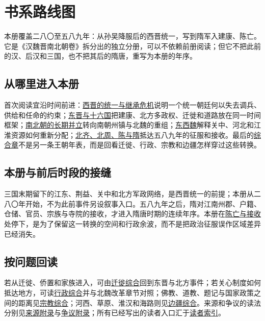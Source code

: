 \chapter{书系路线图}
\label{app:series-roadmap}

本册覆盖二八〇至五八九年：从孙吴降服后的西晋统一，写到隋军入建康、陈亡。它是《汉魏晋南北朝卷》拆分出的独立分册，可以不依赖前册阅读；但它不把此前的汉、后汉和三国，也不把其后的隋唐，重写为本册的年序。

\section{从哪里进入本册}

首次阅读宜沿时间前进：\hyperref[ch:western-jin]{西晋的统一与继承危机}说明一个统一朝廷何以失去调兵、供给和任命的约束；\hyperref[ch:eastern-jin-sixteen-kingdoms]{东晋与十六国}把建康、北方多政权、迁徙和道路放在同一时间框架；\hyperref[ch:northern-southern-dynasties]{南北朝的长期并立}转向南朝州镇与北魏的重组；\hyperref[ch:eastern-western-wei]{东西魏}解释关中、河北和江淮资源如何重新分配；\hyperref[ch:northern-qi-zhou-chen-sui]{北齐、北周、陈与隋}抵达五八九年的征服和接收。最后的\hyperref[ch:synthesis]{综合章}不是另一条王朝年表，而是回看迁徙、行政、宗教和边疆怎样穿过这些转换。

\section{本册与前后时段的接缝}

三国末期留下的江东、荆益、关中和北方军政网络，是西晋统一的前提；本册从二八〇年开始，不为此前事件另设叙事入口。五八九年之后，隋对江南州郡、户籍、仓储、官员、宗族与寺院的接收，才进入隋唐时期的连续年序。本册在\hyperref[sec:chen-sui-reunification]{陈亡与接收}处停下，是为了保留这一转换的空间和行政余波，而不是把政治征服误作区域差异已经消失。

\section{按问题回读}

若从迁徙、侨置和家族进入，可由\hyperref[sec:synthesis-migration]{迁徙综合}回到东晋与北方事件；若关心制度如何抵达地方，可读\hyperref[sec:synthesis-administration]{行政综合}并与北魏改革章节对照；佛教、道教、题记与国家政策之间的距离见\hyperref[sec:synthesis-religion]{宗教综合}；河西、草原、淮汉和海路则见\hyperref[sec:synthesis-frontier]{边疆综合}。来源和争议的读法分别见\hyperref[app:sources]{来源附录}与\hyperref[app:controversies]{争议附录}；所有已经写出的读者入口汇于\hyperref[app:index]{读者索引}。
